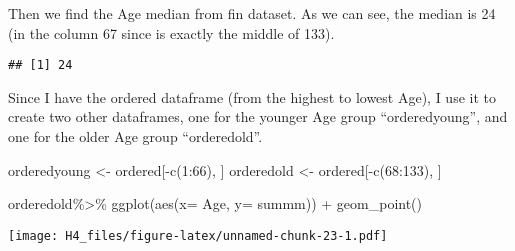 \documentclass[
]{article}
\newenvironment{Shaded}{\begin{snugshade}}{\end{snugshade}}
\newcommand{\AttributeTok}[1]{\textcolor[rgb]{0.77,0.63,0.00}{#1}}
\newcommand{\ConstantTok}[1]{\textcolor[rgb]{0.00,0.00,0.00}{#1}}
\newcommand{\DecValTok}[1]{\textcolor[rgb]{0.00,0.00,0.81}{#1}}
\newcommand{\FunctionTok}[1]{\textcolor[rgb]{0.00,0.00,0.00}{#1}}
\newcommand{\NormalTok}[1]{#1}
\newcommand{\OtherTok}[1]{\textcolor[rgb]{0.56,0.35,0.01}{#1}}
\newcommand{\SpecialCharTok}[1]{\textcolor[rgb]{0.00,0.00,0.00}{#1}}
\newcommand{\StringTok}[1]{\textcolor[rgb]{0.31,0.60,0.02}{#1}}
\begin{document}
\begin{Shaded}
\end{Shaded}

Then we find the Age median from fin dataset. As we can see, the median
is 24 (in the column 67 since is exactly the middle of 133).

\begin{Shaded}
\end{Shaded}

\begin{verbatim}
## [1] 24
\end{verbatim}

Since I have the ordered dataframe (from the highest to lowest Age), I
use it to create two other dataframes, one for the younger Age group
``orderedyoung'', and one for the older Age group ``orderedold''.

\begin{Shaded}
\begin{Highlighting}[]
\NormalTok{orderedyoung }\OtherTok{\textless{}{-}}\NormalTok{ ordered[}\SpecialCharTok{{-}}\FunctionTok{c}\NormalTok{(}\DecValTok{1}\SpecialCharTok{:}\DecValTok{66}\NormalTok{), ]}
\NormalTok{orderedold }\OtherTok{\textless{}{-}}\NormalTok{ ordered[}\SpecialCharTok{{-}}\FunctionTok{c}\NormalTok{(}\DecValTok{68}\SpecialCharTok{:}\DecValTok{133}\NormalTok{), ]}
\end{Highlighting}
\end{Shaded}

orderedold\%\textgreater\% ggplot(aes(x= Age, y= summm)) + geom\_point()

\begin{Shaded}
\end{Shaded}

\texttt{[image: H4\_files/figure-latex/unnamed-chunk-23-1.pdf]}
\end{document}
